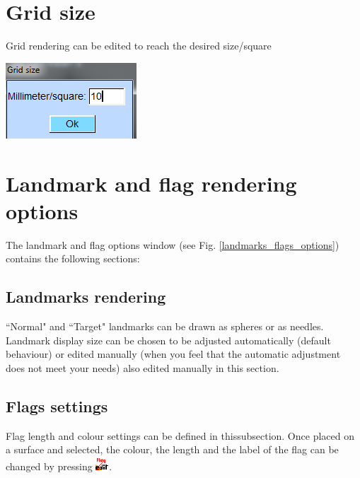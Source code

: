 \section{Grid size}


\noindent
\begin{minipage}{0.55\textwidth}
Grid rendering can be edited to reach the desired size/square
\end{minipage}  
 \begin{minipage}{0.45\textwidth}\centering
\includegraphics[scale=0.5]{images/Viewing_options/Grid_size.png}

 \end{minipage} 
\noindent





\section{Landmark and flag rendering options}
The landmark and flag options window (see Fig. \ref{landmarks_flags_options}) contains the following sections:

\subsection{Landmarks rendering}
``Normal" and ``Target" landmarks can be drawn as spheres or as needles. Landmark display size can be chosen to be adjusted automatically (default behaviour) or edited manually (when you feel that the automatic adjustment does not meet your needs) also edited manually in this section.



\subsection{Flags settings}
Flag length and colour settings can be defined in thissubsection. Once placed on a surface and selected, the colour, the length and the label of the flag can be changed by pressing
\includegraphics[scale=0.7]{images/pixmap/Flag02.png}.


